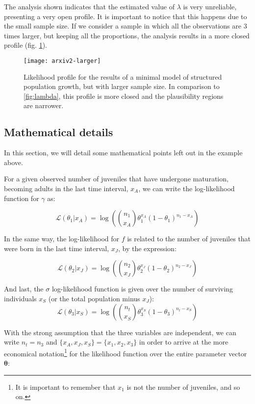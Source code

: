 \documentclass[twoside,12pt,a4paper]{article}
\begin{document}
The analysis shown indicates that the estimated value of $\lambda$ is very unreliable, presenting a
very open profile. It is important to notice that this happens due to the small sample size. If we consider
a sample in which all the observations are 3 times larger, but keeping all the proportions,
the analysis results in a more closed profile (fig. \ref{fig:lambda2}).

\begin{figure}
\texttt{[image: arxiv2-larger]}
	\caption{Likelihood profile for the results of a minimal model of structured population growth, but with
  larger sample size. In comparison to \ref{fig:lambda}, this profile is more closed and the plausibility
  regions are narrower. }
	\label{fig:lambda2}
\end{figure}

\newpage
\subsection{Mathematical details}\label{apmat}
In this section, we will detail some mathematical points left out in the example above.

For a given observed number of juveniles that have undergone maturation, becoming adults in the last time
interval, $x_A$, we can write the log-likelihood function for $\gamma$ as:

\begin{equation}
\mathcal{L} \left( \theta_1 | x_A \right) 
= \log \left( {n_1 \choose x_A} \theta_1^{x_A} (1-\theta_1) ^{n_1-x_A} \right)
\end{equation}

In the same way, the log-likelihood for $f$ is related to the number of juveniles that were born in the
last time interval, $x_J$, by the expression:

\begin{equation}
\mathcal{L} \left( \theta_2 | x_J \right) 
= \log \left( {n_2 \choose x_J} \theta_2^{x_J} (1-\theta_2) ^{n_2-x_J} \right)
\end{equation}

And last, the $\sigma$ log-likelihood function is given over the number of surviving individuals $x_S$
(or the total population minus $x_J$):
\begin{equation}
\mathcal{L} \left( \theta_3 | x_S \right) 
= \log \left( {n_t \choose x_S} \theta_3^{x_S} (1-\theta_3) ^{n_t-x_S} \right)
\end{equation}

With the strong assumption that the three variables are independent, we can write $n_t = n_3$ and
$\{x_A, x_J, x_S\} = \{x_1, x_2, x_3\}$ in order to arrive at the more economical notation\footnote{
It is important to remember that $x_1$ is not the number of juveniles, and so on.}
for the likelihood function over the entire parameter vector $\boldsymbol\theta$:
\end{document}
